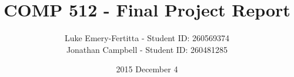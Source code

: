 \documentclass[11pt]{article}
\begin{document}
\title{COMP 512 - Final Project Report}
\author{Luke Emery-Fertitta - Student ID: 260569374 \\ Jonathan Campbell - Student ID: 260481285}
\date{2015 December 4}
\maketitle
\end{document}
